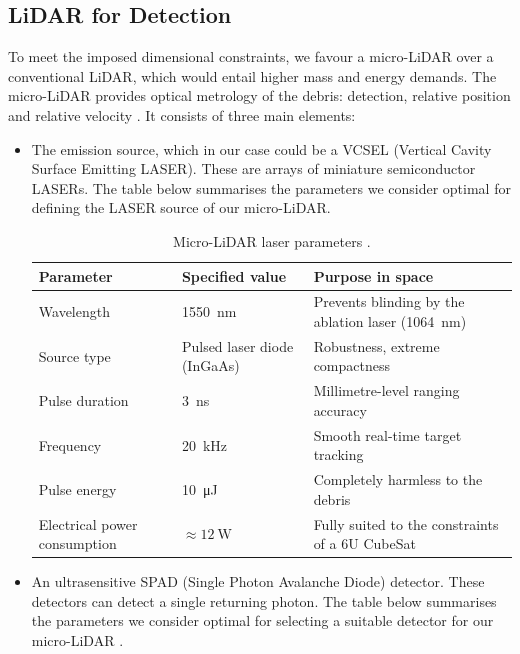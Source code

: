 \subsection{LiDAR for Detection}
To meet the imposed dimensional constraints, we favour a micro-LiDAR over a conventional LiDAR, which would entail higher mass and energy demands. The micro-LiDAR provides optical metrology of the debris: detection, relative position and relative velocity \cite{OpromollaNocerino}. It consists of three main elements:
\begin{itemize}
    \item The emission source, which in our case could be a VCSEL (Vertical Cavity Surface Emitting LASER). These are arrays of miniature semiconductor LASERs. The table below summarises the parameters we consider optimal for defining the LASER source of our micro-LiDAR.

    \begin{table}[H]
      \centering
      \small
      \caption{Micro-LiDAR laser parameters \cite{VCSEL1550_2023}.}
      \label{tab:lidar_laser}
      \begin{tabular}{p{3.3cm} p{4.7cm} p{6.5cm}}
        \toprule
        \textbf{Parameter} & \textbf{Specified value} & \textbf{Purpose in space} \\
        \midrule
        Wavelength & \SI{1550}{\nano\metre} & Prevents blinding by the ablation laser (\SI{1064}{\nano\metre}) \\
        Source type & Pulsed laser diode (InGaAs) & Robustness, extreme compactness \\
        Pulse duration & \SI{3}{\nano\second} & Millimetre-level ranging accuracy \\
        Frequency & \SI{20}{\kilo\hertz} & Smooth real-time target tracking \\
        Pulse energy & \SI{10}{\micro\joule} & Completely harmless to the debris \\
        Electrical power consumption & $\approx\SI{12}{\watt}$ & Fully suited to the constraints of a 6U CubeSat \\
        \bottomrule
      \end{tabular}
    \end{table}

    \item An ultrasensitive SPAD (Single Photon Avalanche Diode) detector. These detectors can detect a single returning photon. The table below summarises the parameters we consider optimal for selecting a suitable detector for our micro-LiDAR \cite{Pellegrini2006}.


\end{itemize}
